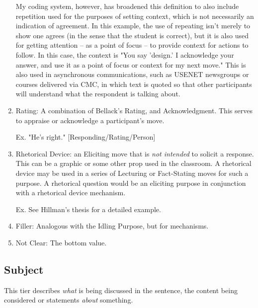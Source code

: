 \documentclass[10pt, letterpaper]{article}
\begin{document}
\begin{enumerate}
My coding system, however, has broadened this definition to also include
repetition used for the purposes of setting context, which is not
necessarily an indication of agreement. In this example, the use of
repeating isn't merely to show one agrees (in the sense that the student
is correct), but it is also used for getting attention -- as a point of
focus -- to provide context for actions to follow. In this case, the
context is "You say 'design.' I acknowledge your answer, and use it as a
point of focus or context for my next move." This is also used in
asynchronous communications, such as USENET newsgroups or courses
delivered via CMC, in which text is quoted so that other participants will
understand what the respondent is talking about.

\item Rating: A combination of Bellack's Rating, and Acknowledgment. This
serves to appraise or acknowledge a participant's move.

Ex. "He's right." [Responding/Rating/Person]

\item Rhetorical Device: an Eliciting move that is \emph{not intended} to solicit a
response. This can be a graphic or some other prop used in the classroom.
A rhetorical device may be used in a series of Lecturing or Fact-Stating
moves for such a purpose. A rhetorical question would be an eliciting
purpose in conjunction with a rhetorical device mechanism.

Ex. See Hillman's thesis for a detailed example.

\item Filler: Analogous with the Idling Purpose, but for mechanisms.

\item Not Clear: The bottom value.
\end{enumerate}
\subsection*{Subject}
\label{sec:orgb8a84ee}
This tier describes \emph{what} is being discussed in the sentence, the content
being considered or statements \emph{about} something.
\end{document}
